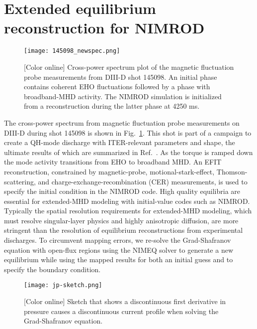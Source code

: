 \section{Extended equilibrium reconstruction for NIMROD}
\label{sec:reconstruct}

\begin{figure}
  \centering
  \texttt{[image: 145098\_newspec.png]}
  \vspace{-4mm}
  \caption{[Color online]
  Cross-power spectrum plot of the magnetic fluctuation probe measurements
  from DIII-D shot 145098. An initial phase contains coherent EHO fluctuations
  followed by a phase with broadband-MHD activity. The NIMROD simulation
  is initialized from a reconstruction during the latter phase at 4250 ms.
  }
  \label{fig:newspec}
\end{figure}

The cross-power spectrum from magnetic fluctuation probe measurements on DIII-D
during shot 145098 is shown in Fig.~\ref{fig:newspec}.  This shot is part of a
campaign to create a QH-mode discharge with ITER-relevant parameters and shape,
the ultimate results of which are summarized in Ref.~\cite{garofalo15}.  As the
torque is ramped down the mode activity transitions from EHO to broadband MHD.
An EFIT \cite{lao85,lao05} reconstruction, constrained by magnetic-probe,
motional-stark-effect, Thomson-scattering, and charge-exchange-recombination
(CER) measurements, is used to specify the initial condition in the NIMROD code.
High quality equilibria are essential for extended-MHD modeling with
initial-value codes such as NIMROD.  Typically the spatial resolution
requirements for extended-MHD modeling, which must resolve singular-layer
physics and highly anisotropic diffusion, are more stringent than the
resolution of equilibrium reconstructions from experimental discharges. To
circumvent mapping errors, we re-solve the Grad-Shafranov equation with
open-flux regions using the NIMEQ \cite{Howell14} solver to generate a new
equilibrium while using the mapped results for both an initial guess and to
specify the boundary condition. 

\begin{SCfigure}
  \texttt{[image: jp-sketch.png]}
  \caption{[Color online]
  Sketch that shows a discontinuous first derivative in pressure
  causes a discontinuous current profile when solving the Grad-Shafranov 
  equation.}
  \label{fig:jp-sketch}
\end{SCfigure}

